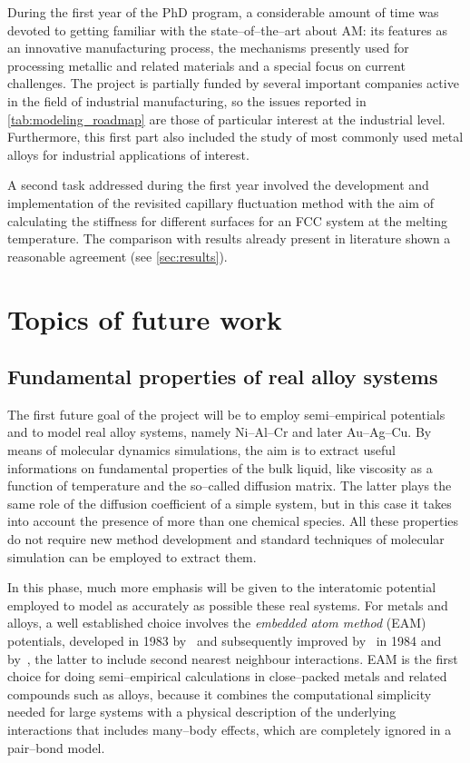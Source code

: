 During the first year of the PhD program, a considerable amount of time was devoted to getting familiar with the state--of--the--art about AM: its features as an innovative manufacturing process, the mechanisms presently used for processing metallic and related materials and a special focus on current challenges. The project is partially funded by several important companies active in the field of industrial manufacturing, so the issues reported in \cref{tab:modeling_roadmap} are those of particular interest at the industrial level. Furthermore, this first part also included the study of most commonly used metal alloys for industrial applications of interest. 

A second task addressed during the first year involved the development and implementation of the revisited capillary fluctuation method with the aim of calculating the stiffness for different surfaces for an FCC system at the melting temperature. The comparison with results already present in literature shown a reasonable agreement (see \cref{sec:results}).



\section{Topics of future work}

\subsection{Fundamental properties of real alloy systems}
The first future goal of the project will be to employ semi--empirical potentials and to model real alloy systems, namely Ni--Al--Cr and later Au--Ag--Cu. By means of molecular dynamics simulations, the aim is to extract useful informations on fundamental properties of the bulk liquid, like viscosity as a function of temperature and the so--called diffusion matrix. The latter plays the same role of the diffusion coefficient of a simple system, but in this case it takes into account the presence of more than one chemical species. All these properties do not require new method development and standard techniques of molecular simulation can be employed to extract them.

In this phase, much more emphasis will be given to the interatomic potential employed to model as accurately as possible these real systems. For metals and alloys, a well established choice involves the \textit{embedded atom method} (EAM) potentials, developed in 1983 by~\textcite{Daw1983EAM,Daw1984EAM} and subsequently improved by~\textcite{Finnis1984EAM} in 1984 and by~\textcite{Lee2000}, the latter to include second nearest neighbour interactions. EAM is the first choice for doing semi--empirical calculations in close--packed metals and related compounds such as alloys, because it combines the computational simplicity needed for large systems with a physical description of the underlying interactions that includes many--body effects, which are completely ignored in a pair--bond model.


